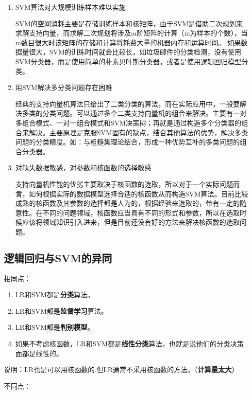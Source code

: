 \begin{enumerate}\itemsep0em 
		\item SVM算法对大规模训练样本难以实施  

			SVM的空间消耗主要是存储训练样本和核矩阵，由于SVM是借助二次规划来求解支持向量，而求解二次规划将涉及m阶矩阵的计算（m为样本的个数），当m数目很大时该矩阵的存储和计算将耗费大量的机器内存和运算时间。 如果数据量很大，SVM的训练时间就会比较长，如垃圾邮件的分类检测，没有使用SVM分类器，而是使用简单的朴素贝叶斯分类器，或者是使用逻辑回归模型分类。

		\item 用SVM解决多分类问题存在困难

			经典的支持向量机算法只给出了二类分类的算法，而在实际应用中，一般要解决多类的分类问题。可以通过多个二类支持向量机的组合来解决。主要有一对多组合模式、一对一组合模式和SVM决策树；再就是通过构造多个分类器的组合来解决。主要原理是克服SVM固有的缺点，结合其他算法的优势，解决多类问题的分类精度。如：与粗糙集理论结合，形成一种优势互补的多类问题的组合分类器。

		\item 对缺失数据敏感，对参数和核函数的选择敏感

			支持向量机性能的优劣主要取决于核函数的选取，所以对于一个实际问题而言，如何根据实际的数据模型选择合适的核函数从而构造SVM算法。目前比较成熟的核函数及其参数的选择都是人为的，根据经验来选取的，带有一定的随意性。在不同的问题领域，核函数应当具有不同的形式和参数，所以在选取时候应该将领域知识引入进来，但是目前还没有好的方法来解决核函数的选取问题。
\end{enumerate}


\subsection{逻辑回归与SVM的异同}

相同点：

\begin{enumerate}\itemsep0em 
		\item LR和SVM都是{\bf 分类}算法。
		\item LR和SVM都是{\bf 监督学习}算法。
		\item LR和SVM都是{\bf 判别模型}。
		\item 如果不考虑核函数，LR和SVM都是{\bf 线性分类}算法，也就是说他们的分类决策面都是线性的。
\end{enumerate}

说明：LR也是可以用核函数的.但LR通常不采用核函数的方法。（{\bf 计算量太大}）


不同点：

